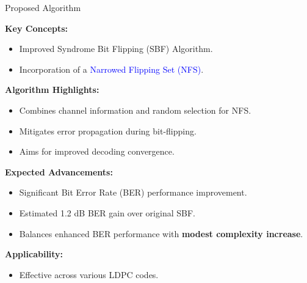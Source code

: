 \documentclass[aspectratio=169,8pt]{beamer}
\begin{document}
\begin{frame}{Proposed Algorithm}
  \vspace{-0.1cm}
  \centering
  \begin{minipage}{0.7\textwidth}
      

        \textbf{Key Concepts:}
        \begin{itemize}
          \item Improved Syndrome Bit Flipping (SBF) Algorithm.
          \item Incorporation of a \textcolor{blue}{Narrowed Flipping Set (NFS)}.
        \end{itemize}

        \vspace{\baselineskip}

        \textbf{Algorithm Highlights:}
        \begin{itemize}
          \item Combines channel information and random selection for NFS.
          \item Mitigates error propagation during bit-flipping.
          \item Aims for improved decoding convergence.
        \end{itemize}

        \vspace{\baselineskip}

        \textbf{Expected Advancements:}
        \begin{itemize}
          \item Significant Bit Error Rate (BER) performance improvement.
          \item Estimated \alert{1.2 dB} BER gain over original SBF.
          \item Balances enhanced BER performance with \textbf{modest complexity increase}.
        \end{itemize}

        \vspace{\baselineskip}
  
        \textbf{Applicability:}
        \begin{itemize}
          \item Effective across various LDPC codes.
        \end{itemize}
  
  \end{minipage}
\end{frame}
\end{document}
